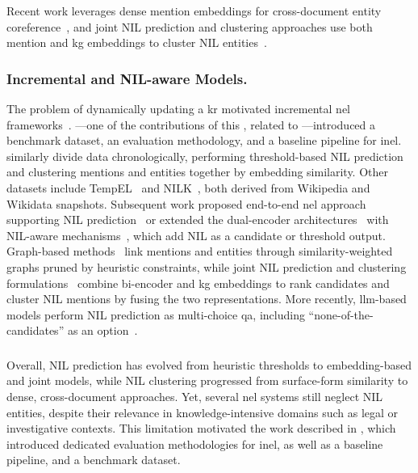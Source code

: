 Recent work leverages dense mention embeddings for cross-document entity coreference~\cite{streaming_crossdoc_coreference}, and joint NIL prediction and clustering approaches use both mention and \ac{kg} embeddings to cluster NIL entities~\cite{moller2024entity}.


\subsubsection{Incremental and NIL-aware Models.}
The problem of dynamically updating a \ac{kr} motivated incremental \ac{nel} frameworks~\cite{ijckg2022,kassner-etal-2022-edin}.
\textcite{ijckg2022}---one of the contributions of this \phd, related to ---introduced a benchmark dataset, an evaluation methodology, and a baseline pipeline for \acl{inel}. 
\textcite{kassner-etal-2022-edin} similarly divide data chronologically, performing threshold-based NIL prediction and clustering mentions and entities together by embedding similarity.  
Other datasets include TempEL~\cite{tempel_2022} and NILK~\cite{nilk_dataset_2022}, both derived from Wikipedia and Wikidata snapshots.  
Subsequent work proposed end-to-end \ac{nel} approach supporting NIL prediction~\cite{ayoola-etal-2022-refined} or extended the dual-encoder architectures~\cite{blink} with NIL-aware mechanisms~\cite{aydin-etal-2022-find,Heist2023nastylinker,zhu-etal-2023-learn,dong_reveal_the_unknown_2023}, which add NIL as a candidate or threshold output.  
Graph-based methods~\cite{agarwal-etal-2022-entity} link mentions and entities through similarity-weighted graphs pruned by heuristic constraints, while joint NIL prediction and clustering formulations~\cite{moller2024entity} combine bi-encoder and \ac{kg} embeddings to rank candidates and cluster NIL mentions by fusing the two representations.
More recently, \ac{llm}-based models perform NIL prediction as multi-choice \acl{qa}, including ``none-of-the-candidates'' as an option~\cite{zhou-etal-2024-gendecider,ding-etal-2024-chatel}.


\subsubsection{}
Overall, NIL prediction has evolved from heuristic thresholds to embedding-based and joint models, while NIL clustering progressed from surface-form similarity to dense, cross-document approaches. Yet, several \ac{nel} systems still neglect NIL entities, despite their relevance in knowledge-intensive domains such as legal or investigative contexts. This limitation motivated the work described in , which introduced dedicated evaluation methodologies for \acl{inel}, as well as a baseline pipeline, and a benchmark dataset.

